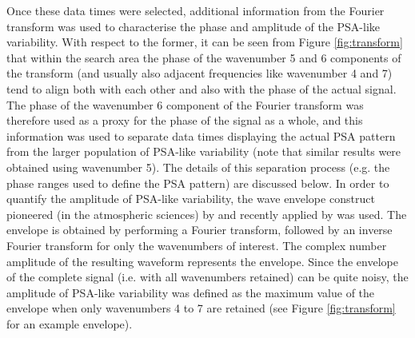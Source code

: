 Once these data times were selected, additional information from the Fourier transform was used to characterise the phase and amplitude of the PSA-like variability. With respect to the former, it can be seen from Figure \ref{fig:transform} that within the search area the phase of the wavenumber 5 and 6 components of the transform (and usually also adjacent frequencies like wavenumber 4 and 7) tend to align both with each other and also with the phase of the actual signal. The phase of the wavenumber 6 component of the Fourier transform was therefore used as a proxy for the phase of the signal as a whole, and this information was used to separate data times displaying the actual PSA pattern from the larger population of PSA-like variability (note that similar results were obtained using wavenumber 5). The details of this separation process (e.g. the phase ranges used to define the PSA pattern) are discussed below. In order to quantify the amplitude of PSA-like variability, the wave envelope construct pioneered (in the atmospheric sciences) by \citet{Zimin2003} and recently applied by \citet{IrvingSimmonds2015} was used. The envelope is obtained by performing a Fourier transform, followed by an inverse Fourier transform for only the wavenumbers of interest. The complex number amplitude of the resulting waveform represents the envelope. Since the envelope of the complete signal (i.e. with all wavenumbers retained) can be quite noisy, the amplitude of PSA-like variability was defined as the maximum value of the envelope when only wavenumbers 4 to 7 are retained (see Figure \ref{fig:transform} for an example envelope).

